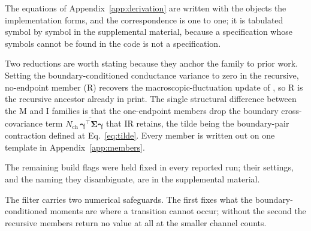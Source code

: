 The equations of Appendix~\ref{app:derivation} are written with the objects the implementation
forms, and the correspondence is one to one; it is tabulated symbol by symbol in the supplemental material, because a specification whose symbols cannot be found in the code is not a specification.


Two reductions are worth stating because they anchor the family to prior work.
Setting the boundary-conditioned conductance variance to zero in the recursive,
no-endpoint member (R) recovers the macroscopic-fluctuation update of
\citet{moffatt2007estimation}, so R is the recursive ancestor already in print.
The single structural difference between the M and I families is that the
one-endpoint members drop the boundary cross-covariance term
$N_{\mathrm{ch}}\,\widetilde{\boldsymbol{\gamma}^\top\boldsymbol{\Sigma}\boldsymbol{\gamma}}$ that IR retains, the
tilde being the boundary-pair contraction defined at Eq.~\ref{eq:tilde}. Every member is
written out on one template in Appendix~\ref{app:members}.

The remaining build flags were held fixed in every reported run; their settings, and the
naming they disambiguate, are in the supplemental material.

The filter carries two numerical safeguards. The first fixes what the boundary-conditioned
moments are where a transition cannot occur; without the second the recursive members
return no value at all at the smaller channel counts.


